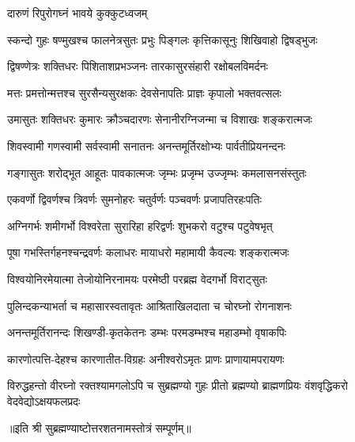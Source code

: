 
{दारुणं रिपुरोगघ्नं भावये कुक्कुटध्वजम्}

\twolineshloka
{स्कन्दो गुहः षण्मुखश्च फालनेत्रसुतः प्रभुः}
{पिङ्गलः कृत्तिकासूनुः शिखिवाहो द्विषड्भुजः}%

\twolineshloka
{द्विषण्णेत्रः शक्तिधरः पिशिताशप्रभञ्जनः}
{तारकासुरसंहारी रक्षोबलविमर्दनः}%

\twolineshloka
{मत्तः प्रमत्तोन्मत्तश्च सुरसैन्यसुरक्षकः}
{देवसेनापतिः प्राज्ञः कृपालो भक्तवत्सलः}%

\twolineshloka
{उमासुतः शक्तिधरः कुमारः क्रौञ्चदारणः}
{सेनानीरग्निजन्मा च विशाखः शङ्करात्मजः}%

\twolineshloka
{शिवस्वामी गणस्वामी सर्वस्वामी सनातनः}
{अनन्तमूर्तिरक्षोभ्यः पार्वतीप्रियनन्दनः}%

\twolineshloka
{गङ्गासुतः शरोद्भूत आहूतः पावकात्मजः}
{जृम्भः प्रजृम्भ उज्जृम्भः कमलासनसंस्तुतः}%

\twolineshloka
{एकवर्णो द्विवर्णश्च त्रिवर्णः सुमनोहरः}
{चतुर्वर्णः पञ्चवर्णः प्रजापतिरहःपतिः}%

\twolineshloka
{अग्निगर्भः शमीगर्भो विश्वरेता सुरारिहा}
{हरिद्वर्णः शुभकरो वटुश्च पटुवेषभृत्}%

\twolineshloka
{पूषा गभस्तिर्गहनश्चन्द्रवर्णः कलाधरः}
{मायाधरो महामायी कैवल्यः शङ्करात्मजः}%

\twolineshloka
{विश्वयोनिरमेयात्मा तेजोयोनिरनामयः}
{परमेष्ठी परब्रह्म वेदगर्भो विराट्सुतः}%

\twolineshloka
{पुलिन्दकन्याभर्ता च महासारस्वतावृतः}
{आश्रिताखिलदाता च चोरघ्नो रोगनाशनः}%

\twolineshloka
{अनन्तमूर्तिरानन्दः शिखण्डी-कृतकेतनः}
{डम्भः परमडम्भश्च महाडम्भो वृषाकपिः}%

\twolineshloka
{कारणोत्पत्ति-देहश्च कारणातीत-विग्रहः}
{अनीश्वरोऽमृतः प्राणः प्राणायामपरायणः}%

\threelineshloka
{विरुद्धहन्तो वीरघ्नो रक्तश्यामगलोऽपि च}
{सुब्रह्मण्यो गुहः प्रीतो ब्रह्मण्यो ब्राह्मणप्रियः}
{वंशवृद्धिकरो वेदवेद्योऽक्षयफलप्रदः}%

॥इति श्री सुब्रह्मण्याष्टोत्तरशतनामस्तोत्रं सम्पूर्णम्॥